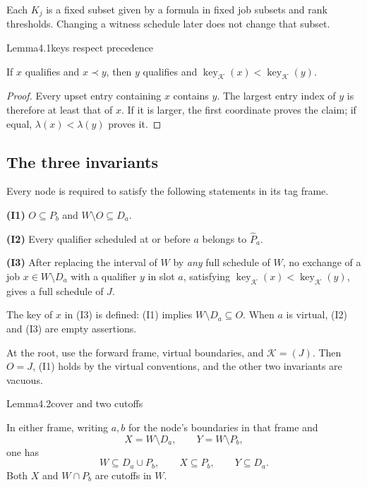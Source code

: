 Each \(K_j\) is a fixed subset given by a formula in fixed job subsets and rank thresholds. Changing a witness schedule later does not change that subset.

\begin{numbered}{Lemma}{4.1}{keys respect precedence}

If \(x\) qualifies and \(x\prec y\), then \(y\) qualifies and \(\operatorname{key}_{\mathcal K}(x)<\operatorname{key}_{\mathcal K}(y)\).

\end{numbered}

\begin{proof}
Every upset entry containing \(x\) contains \(y\). The largest entry index of \(y\) is therefore at least that of \(x\). If it is larger, the first coordinate proves the claim; if equal, \(\lambda(x)<\lambda(y)\) proves it.
\end{proof}

\subsection{The three invariants}

Every node is required to satisfy the following statements in its tag frame.

\textbf{(I1)} \(O\subseteq P_b\) and \(W\setminus O\subseteq D_a\).

\textbf{(I2)} Every qualifier scheduled at or before \(a\) belongs to \(\widehat P_a\).

\textbf{(I3)} After replacing the interval of \(W\) by \emph{any} full schedule of \(W\), no exchange of a job \(x\in W\setminus D_a\) with a qualifier \(y\) in slot \(a\), satisfying \(\operatorname{key}_{\mathcal K}(x)<\operatorname{key}_{\mathcal K}(y)\), gives a full schedule of \(J\).

The key of \(x\) in (I3) is defined: (I1) implies \(W\setminus D_a\subseteq O\). When \(a\) is virtual, (I2) and (I3) are empty assertions.

At the root, use the forward frame, virtual boundaries, and \(\mathcal K=(J)\). Then \(O=J\), (I1) holds by the virtual conventions, and the other two invariants are vacuous.

\begin{numbered}{Lemma}{4.2}{cover and two cutoffs}

In either frame, writing \(a,b\) for the node's boundaries in that frame and \[
X=W\setminus D_a,\qquad Y=W\setminus P_b,
\] one has \[
W\subseteq D_a\cup P_b,\qquad X\subseteq P_b,\qquad Y\subseteq D_a.
\tag{4.2}
\] Both \(X\) and \(W\cap P_b\) are cutoffs in \(W\).

\end{numbered}

